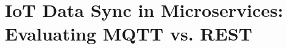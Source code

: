 \chapter[IoT Data Sync in Microservices]{IoT Data Sync in Microservices: Evaluating MQTT vs. REST}







